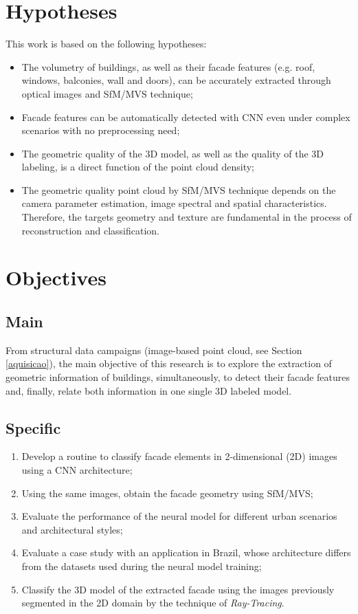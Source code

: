 \section{Hypotheses}
This work is based on the following hypotheses:    
\begin{itemize}      

    \item The volumetry of buildings, as well as their facade features (e.g. roof, windows, balconies, wall and doors), can be accurately extracted through optical images and SfM/MVS technique;           
    \item Facade features can be automatically detected with CNN even under complex scenarios with no preprocessing need;    
    \item The geometric quality of the 3D model, as well as the quality of the 3D labeling, is a direct function of the point cloud density;  
    \item The geometric quality point cloud by SfM/MVS technique depends on the camera parameter estimation, image spectral and spatial characteristics. Therefore, the targets geometry and texture are fundamental in the process of reconstruction and classification.          
\end{itemize}

\section{Objectives}
\subsection{Main}
From structural data campaigns (image-based point cloud, see Section \ref{aquisicao}), the main objective of this research is to explore the extraction of geometric information of buildings, simultaneously, to detect their facade features and, finally, relate both information in one single 3D labeled model.

\subsection{Specific}
\begin{enumerate}	
    \item Develop a routine to classify facade elements in 2-dimensional (2D) images using a CNN architecture;
    \item Using the same images, obtain the facade geometry using SfM/MVS;
    \item Evaluate the performance of the neural model for different urban scenarios and architectural styles;
    \item Evaluate a case study with an application in Brazil, whose architecture differs from the datasets used during the neural model training;
    \item Classify the 3D model of the extracted facade using the images previously segmented in the 2D domain by the technique of \emph{Ray-Tracing}.    
\end{enumerate}

